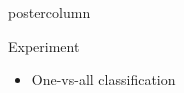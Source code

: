 \documentclass[final]{beamer}
\begin{document}
\begin{frame}
\begin{columns}
\begin{column}{.49\textwidth}
\begin{beamercolorbox}[center,wd=\textwidth]{postercolumn}
\begin{minipage}[T]{.95\textwidth}
{\begin{block}{Experiment}
\begin{itemize}
\begin{itemize}
\begin{columns}
            		 	\begin{column}{.33\textwidth}
            				\\
            		 	\end{column}
				\end{columns}
				\item One-vs-all classification
				\end{itemize}
            		

\end{itemize}
\end{block}}
\end{minipage}
\end{beamercolorbox}
\end{column}
\end{columns}
\end{frame}
\end{document}
